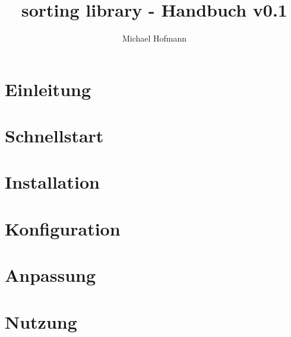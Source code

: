 \documentclass[11pt,a4paper]{scrreprt}
\begin{document}
\title{sorting library - Handbuch v0.1}

\author{Michael Hofmann}

\maketitle

\chapter{Einleitung}

\chapter{Schnellstart}

\chapter{Installation}

\chapter{Konfiguration}

\chapter{Anpassung}

\chapter{Nutzung}

\end{document}
